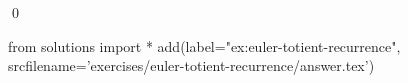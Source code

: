 
    \begin{ex}
  \label{ex:euler-totient-recurrence}
  
  \qed
\end{ex}
\begin{python0}
from solutions import *
add(label="ex:euler-totient-recurrence",
    srcfilename='exercises/euler-totient-recurrence/answer.tex') 
\end{python0}                              
